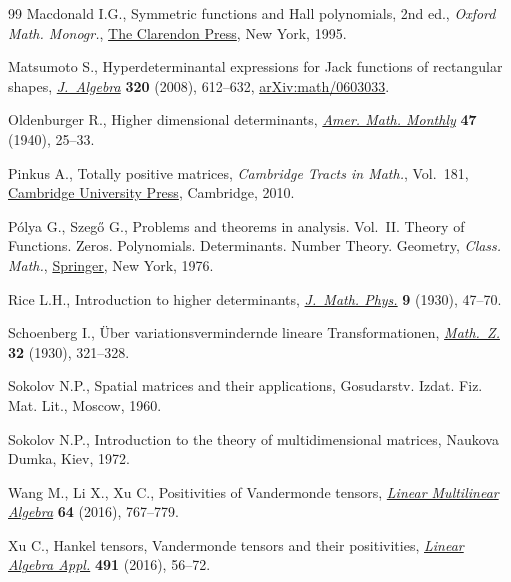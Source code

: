 \documentclass[pdftex]{sigma}
\numberwithin{equation}{section}
\begin{document}
\begin{thebibliography}{99}
Macdonald I.G., Symmetric functions and {H}all polynomials, 2nd ed., \textit{Oxford
 Math. Monogr.}, \href{https://doi.org/10.1093/oso/9780198534891.001.0001}{The
 Clarendon Press}, New York, 1995.

Matsumoto S., Hyperdeterminantal expressions for {J}ack functions of
 rectangular shapes,
 \href{https://doi.org/10.1016/j.jalgebra.2007.09.013}{\textit{J.~Algebra}}
 \textbf{320} (2008), 612--632,
 \href{http://arxiv.org/abs/math/0603033}{arXiv:math/0603033}.

Oldenburger R., Higher dimensional determinants,
 \href{https://doi.org/10.2307/2304053}{\textit{Amer. Math. Monthly}}
 \textbf{47} (1940), 25--33.

Pinkus A., Totally positive matrices, \textit{Cambridge Tracts in Math.}, Vol.~181, \href{https://doi.org/10.1017/CBO9780511691713}{Cambridge University
 Press}, Cambridge, 2010.

P\'olya G., Szeg\H{o} G., Problems and theorems in analysis. {V}ol.~{II}.
 Theory of Functions. Zeros. Polynomials. Determinants. Number Theory.
 Geometry, \textit{Class. Math.},
 \href{https://doi.org/10.1007/978-3-642-61905-2}{Springer}, New York, 1976.

Rice L.H., Introduction to higher determinants,
 \href{https://doi.org/10.1002/sapm19309147}{\textit{J.~Math. Phys.}}
 \textbf{9} (1930), 47--70.

Schoenberg I., \"Uber variationsvermindernde lineare {T}ransformationen,
 \href{https://doi.org/10.1007/BF01194637}{\textit{Math.~Z.}} \textbf{32}
 (1930), 321--328.

Sokolov N.P., Spatial matrices and their applications, Gosudarstv. Izdat. Fiz.
 Mat. Lit., Moscow, 1960.

Sokolov N.P., Introduction to the theory of multidimensional matrices, Naukova
 Dumka, Kiev, 1972.

Wang M., Li X., Xu C., Positivities of {V}andermonde tensors,
 \href{https://doi.org/10.1080/03081087.2015.1122722}{\textit{Linear
 Multilinear Algebra}} \textbf{64} (2016), 767--779.

Xu C., Hankel tensors, {V}andermonde tensors and their positivities,
 \href{https://doi.org/10.1016/j.laa.2015.02.012}{\textit{Linear Algebra
 Appl.}} \textbf{491} (2016), 56--72.

\end{thebibliography}\LastPageEnding
\end{document}
